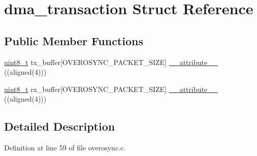 \hypertarget{structdma__transaction}{\section{dma\-\_\-transaction Struct Reference}
\label{structdma__transaction}
}
\subsection*{Public Member Functions}
\begin{DoxyCompactItemize}
\item 
\hyperlink{stdint_8h_aba7bc1797add20fe3efdf37ced1182c5}{uint8\-\_\-t} tx\-\_\-buffer\mbox{[}O\-V\-E\-R\-O\-S\-Y\-N\-C\-\_\-\-P\-A\-C\-K\-E\-T\-\_\-\-S\-I\-Z\-E\mbox{]} \hyperlink{structdma__transaction_af9dac354296543c3960057020bf0f84d}{\-\_\-\-\_\-attribute\-\_\-\-\_\-} ((aligned(4)))
\item 
\hyperlink{stdint_8h_aba7bc1797add20fe3efdf37ced1182c5}{uint8\-\_\-t} rx\-\_\-buffer\mbox{[}O\-V\-E\-R\-O\-S\-Y\-N\-C\-\_\-\-P\-A\-C\-K\-E\-T\-\_\-\-S\-I\-Z\-E\mbox{]} \hyperlink{structdma__transaction_a055dbe16d1b8d2cb21a9ba3338d93387}{\-\_\-\-\_\-attribute\-\_\-\-\_\-} ((aligned(4)))
\end{DoxyCompactItemize}


\subsection{Detailed Description}


Definition at line 59 of file overosync.\-c.



